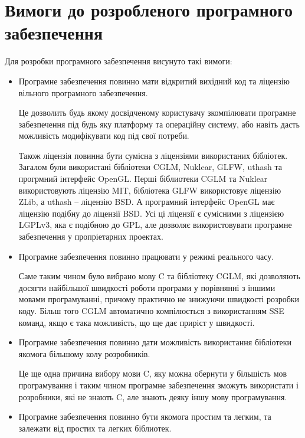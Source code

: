 \documentclass[14pt,a4paper]{extarticle}
\theoremstyle{definition}
\begin{document}

\section{Вимоги до розробленого програмного забезпечення}

Для розробки програмного забезпечення висунуто такі вимоги:
\begin{itemize}
\item Програмне забезпечення повинно мати відкритий вихідний код та ліцензію вільного програмного забезпечення.

Це дозволить будь якому досвідченому користувачу зкомпілювати програмне забезпечення під будь яку платформу та операційну систему, або навіть дасть можливість модифікувати код під свої потреби.

Також ліцензія повинна бути сумісна з ліцензіями використаних бібліотек. Загалом були використані бібліотеки CGLM, Nuklear, GLFW, uthash та прогрмний інтерфейс OpenGL. Перші біблиотеки CGLM та Nuklear використовують ліцензію MIT, бібліотека GLFW використовує ліцензію ZLib, а uthash -- ліцензію BSD. А програмний інтерфейс OpenGL має ліцензію подібну до ліцензії BSD. Усі ці ліцензії є сумісними з ліцензією LGPLv3, яка є подібною до GPL, але дозволяє використовувати програмне забезпечення у пропріетарних проектах.

\item Програмне забезпечення повинно працювати у режимі реального часу.

Саме таким чином було вибрано мову C та бібліотеку CGLM, які дозволяють досягти найбільшої швидкості роботи програми у порівнянні з іншими мовами програмуванні, причому практично не знижуючи швидкості розробки коду. Більш того CGLM автоматично компілюється з використанням SSE команд, якщо є така можливість, що ще дає приріст у швидкості.

\item Програмне забезпечення повинно дати можливість використання бібліотеки якомога більшому колу розробників.

Це ще одна причина вибору мови C, яку можна обернути у більшість мов програмування і таким чином програмне забезпечення зможуть використати і розробники, які не знають C, але знають деяку іншу мову програмування.

\item Програмне забезпечення повинно бути якомога простим та легким, та залежати від простих та легких біблиотек.


\end{itemize}
\end{document}
